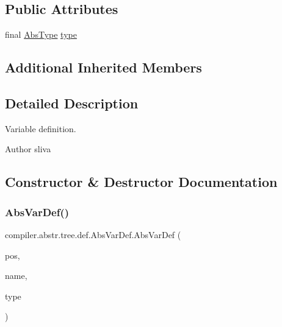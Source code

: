 \subsection*{Public Attributes}
\begin{DoxyCompactItemize}
\item 
final \hyperlink{classcompiler_1_1abstr_1_1tree_1_1type_1_1_abs_type}{Abs\+Type} \hyperlink{classcompiler_1_1abstr_1_1tree_1_1def_1_1_abs_var_def_ad554fe8a1dc94c3adbabe9382f8b048b}{type}
\end{DoxyCompactItemize}
\subsection*{Additional Inherited Members}


\subsection{Detailed Description}
Variable definition.

\begin{DoxyAuthor}{Author}
sliva 
\end{DoxyAuthor}


\subsection{Constructor \& Destructor Documentation}
\mbox{\label{classcompiler_1_1abstr_1_1tree_1_1def_1_1_abs_var_def_afc75c5718c892329c36f593e66df597c}} 
\subsubsection{\texorpdfstring{Abs\+Var\+Def()}{AbsVarDef()}\hspace{0.1cm}{\footnotesize\ttfamily [1/2]}}
{\footnotesize\ttfamily compiler.\+abstr.\+tree.\+def.\+Abs\+Var\+Def.\+Abs\+Var\+Def (\begin{DoxyParamCaption}\item[{\hyperlink{classcompiler_1_1_position}{Position}}]{pos,  }\item[{String}]{name,  }\item[{\hyperlink{classcompiler_1_1abstr_1_1tree_1_1type_1_1_abs_type}{Abs\+Type}}]{type }\end{DoxyParamCaption})}


